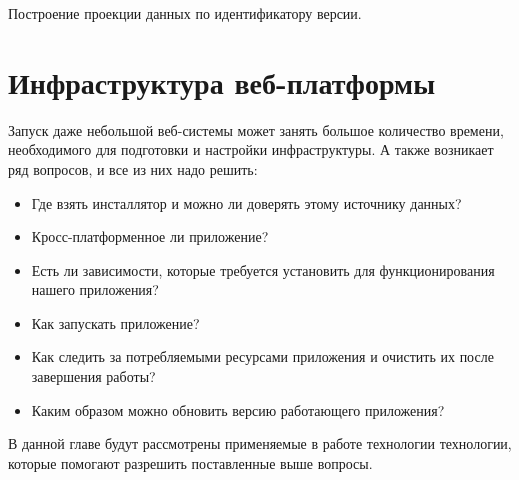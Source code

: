 \documentclass[a4paper,14pt]{extreport} %
\begin{document}
\begin{algorithm}[H]
\SetAlgoLined
{} 




\caption{Построение проекции данных по идентификатору версии.}
\label{MAKE_PROJECTION}
\end{algorithm}

\newpage
\section{Инфраструктура веб-платформы}

Запуск даже небольшой веб-системы может занять большое количество времени, необходимого для подготовки и настройки инфраструктуры.
А также возникает ряд вопросов, и все из них надо решить:
\begin{itemize}
\item Где взять инсталлятор и можно ли доверять этому источнику данных?
\item Кросс-платформенное ли приложение?
\item Есть ли зависимости, которые требуется установить для функционирования нашего приложения?
\item Как запускать приложение?
\item Как следить за потребляемыми ресурсами приложения и очистить их после завершения работы?
\item Каким образом можно обновить версию работающего приложения?
\end{itemize}
В данной главе будут рассмотрены применяемые в работе технологии технологии, которые помогают разрешить поставленные выше вопросы.
\end{document}
